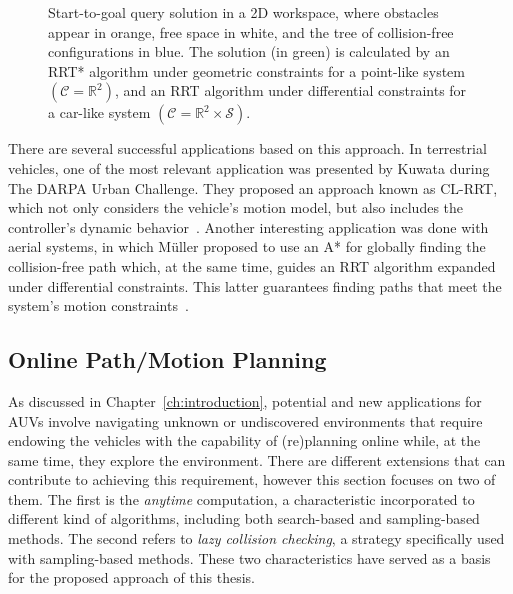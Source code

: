 \begin{figure}[htbp] \myfloatalign
	 \quad
\caption[Comparison between start-to-goal query solutions under geometric and
differential constraints over a 2D workspace.]
{Start-to-goal query solution in a \ac{2D} workspace, where obstacles appear in
orange, free space in white, and the tree of collision-free configurations in
blue. The solution (in green) is calculated by
\protect {} an \ac{RRT*} algorithm under geometric
constraints for a point-like system $\left(\mathcal{C} = \mathbb{R}^{2}\right)$,
and
\protect {} an \ac{RRT} algorithm under differential
constraints for a car-like system $\left(\mathcal{C} = \mathbb{R}^2 \times
\mathcal{S} \right)$.}
\label{fig:PlannConst}
\end{figure}

There are several successful applications based on this approach. In terrestrial
vehicles, one of the most relevant application was presented by Kuwata \etal
during The DARPA Urban Challenge. They proposed an approach known as
\ac{CL-RRT}, which not only considers the vehicle's motion model, but also
includes the controller's dynamic behavior~\cite{Kuwata2009}. Another
interesting application was done with aerial systems, in which M\"uller \etal
proposed to use an A* for globally finding the collision-free path which, at the
same time, guides an \ac{RRT} algorithm expanded under differential constraints.
This latter guarantees finding paths that meet the system's motion
constraints~\cite{Muller2011}.

\subsection{Online Path/Motion Planning}

As discussed in Chapter~\ref{ch:introduction}, potential and new applications
for \acp{AUV} involve navigating unknown or undiscovered environments that
require endowing the vehicles with the capability of (re)planning online while,
at the same time, they explore the environment. There are different extensions
that can contribute to achieving this requirement, however this section focuses
on two of them. The first is the \textit{anytime} computation, a characteristic
incorporated to different kind of algorithms, including both search-based and
sampling-based methods. The second refers to \textit{lazy collision checking}, a
strategy specifically used with sampling-based methods. These two
characteristics have served as a basis for the proposed approach of this thesis.

